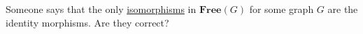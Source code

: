 Someone says that the only \hyperref[D3.28]{isomorphisms} in $\mathbf{Free}(G)$ for some graph $G$ are the identity morphisms. Are they correct?